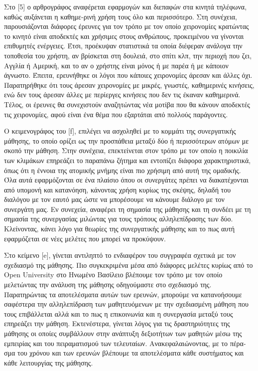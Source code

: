 \documentclass[12pt]{article}
\begin{document}
\begin{abstract*}
  Στο [5] ο αρθρογράφος αναφέρεται εφαρμογών και διεπαφών στα κινητά τηλέφωνα, καθώς αυξάνεται η καθημε-ρινή χρήση τους όλο και περισσότερο. Στη συνέχεια, παρουσιάζονται διάφορες έρευνες για τον τρόπο με τον οποίο χειρονομίες κρατώντας το κινητό είναι αποδεκτές και χρήσιμες στους ανθρώπους, προκειμένου να γίνονται επιθυμητές ενέργειες. Έτσι, προέκυψαν στατιστικά τα οποία διέφεραν ανάλογα την τοποθεσία του χρήστη, αν βρίσκεται στη δουλειά, στο σπίτι κλπ, την περιοχή που ζει, Αγγλία ή Αμερική, και το αν ο χρήστης είναι μόνος ή με παρέα ή με κάποιον άγνωστο. Έπειτα, ερευνήθηκε οι λόγοι που κάποιες χειρονομίες άρεσαν και άλλες όχι. Παρατηρήθηκε ότι τους άρεσαν χειρονομίες με μικρές, γνωστές, καθημερινές κινήσεις, ενώ δεν τους άρεσαν άλλες με περίεργες κινήσεις που δεν τις έκαναν καθημερινά.  Τέλος, οι έρευνες θα συνεχιστούν αναζητώντας νέα μοτίβα που θα κάνουν αποδεκτές τις χειρονομίες, αφού είναι ένα θέμα που εξαρτάται από πολλούς παράγοντες.

  Ο κειμενογράφος του [f], επιλέγει να ασχοληθεί με το κομμάτι της συνεργατικής μάθησης, το οποίο ορίζει ως την προσπάθεια μεταξύ δύο ή περισσότερων ατόμων με σκοπό την μάθηση. Στην συνέχεια, επεκτείνεται στον τρόπο με τον οποίο η ποικιλία των κλιμάκων επηρεάζει το παραπάνω ζήτημα και εντοπίζει διάφορα χαρακτηριστικά, όπως ότι η έννοια της ατομικής μνήμης είναι πιο χρήσιμη από αυτή της ομαδικής. Όλα αυτά εφαρμόζονται σε ένα πλαίσιο όπου οι συνεργάτες πρέπει να διακατέχονται από υπομονή και κατανόηση, κάνοντας χρήση κυρίως της σκέψης, δηλαδή του διαλόγου με τον εαυτό μας ώστε να μπορέσουμε να κάνουμε διάλογο με τον συνεργάτη μας. Εν συνεχεία, αναφέρει τη σημασία της μάθησης και τη συνδέει με τη σημασία της συνεργασίας μιλώντας για τους τρόπους αλληλεπίδρασης των δύο. Κλείνοντας, κάνει λόγο για θεωρίες της συνεργατικής μάθησης και το πως αυτή εφαρμόζεται σε νέες μελέτες που μπορεί να προκύψουν.

  Στο κείμενο [e], γίνεται αντιληπτό το ενδιαφέρον του συγγραφέα σχετικά με τον σχεδιασμό της μάθησης. Πιο συγκεκριμένα μέσα από διάφορες μελέτες κυρίως από το Open University στο Ηνωμένο Βασίλειο βλέπουμε τον τρόπο με τον οποίο μελετώντας την ανάλυση της μάθησης οδηγούμαστε στο σχεδιασμό της. Παρατηρώντας τα αποτελέσματα αυτών των ερευνών, μπορούμε να κατανοήσουμε σαφέστερα την αλληλεπίδραση των μαθητευόμενων με την σχεδιασμένη μάθηση που τους επιβάλλεται αλλά και το πως η επικοινωνία και η συνεργασία μεταξύ τους επηρεάζει την μάθηση. Εκτενέστερα, γίνεται λόγος για τις δραστηριότητες της μάθησης οι οποίες συμβάλλουν στην ανάπτυξη δεξιοτήτων των μαθητών μέσω της εμπειρίας και του πειραματισμού των τελευταίων. Ανακεφαλαιώνοντας, με το πέρα-σμα του χρόνου και των ερευνών βλέπουμε τα αποτελέσματα κάθε συστήματος και κάθε λειτουργίας της μάθησης.


\end{abstract*}
\end{document}
